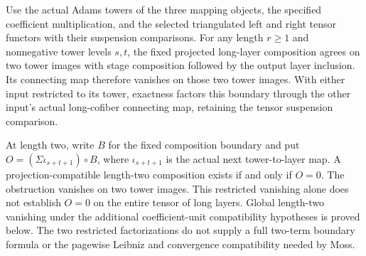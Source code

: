 \begin{proposition}
  \label{prop:moss-long-layer-composition-obstruction}
  \leanok
  Use the actual Adams towers of the three mapping objects, the specified
  coefficient multiplication, and the selected triangulated left and right
  tensor functors with their suspension comparisons.  For any length
  $r\ge1$ and nonnegative tower levels $s,t$,
  the fixed projected long-layer composition agrees on two tower images
  with stage composition followed by the output layer inclusion.  Its
  connecting map therefore vanishes on those two tower images.
  With either input restricted to its tower, exactness factors this boundary
  through the other input's actual long-cofiber connecting map, retaining
  the tensor suspension comparison.

  At length two, write $B$ for the fixed composition boundary and put
  $O=(\Sigma\iota_{s+t+1})\circ B$, where $\iota_{s+t+1}$ is the actual
  next tower-to-layer map.  A projection-compatible length-two composition
  exists if and only if $O=0$.  The obstruction vanishes on two tower
  images.  This restricted vanishing alone does not establish $O=0$ on
  the entire tensor of long layers.  Global length-two vanishing under
  the additional coefficient-unit compatibility hypotheses is proved below.
  The two restricted factorizations do not supply a full two-term boundary
  formula or the pagewise Leibniz and convergence compatibility needed by Moss.
\end{proposition}
